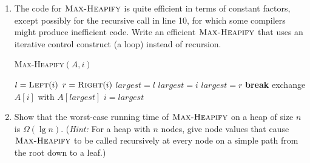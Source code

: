 \documentclass[12pt,reqno]{amsart}
\newif\ifanswer
\begin{document}
\begin{enumerate}[1.]
\item The code for $\textsc{Max-Heapify}$ is quite efficient in terms of constant factors, except possibly for the recursive call in line 10, for which some compilers might produce inefficient code. Write an efficient $\textsc{Max-Heapify}$ that uses an iterative control construct (a loop) instead of recursion.

\ifanswer
{}
\begin{algorithm}
    \caption{\textsc{Max-Heapify}$(A, i)$}
    \begin{algorithmic}[1]
        \STATE $l = \textsc{Left}(i)$
        \STATE $r = \textsc{Right}(i)$
            \STATE $largest = l$
        \ELSE
            \STATE $largest = i$
        \ENDIF
            \STATE $largest = r$
        \ENDIF
            \STATE \textbf{break}
        \ENDIF
        \STATE exchange $A[i]$ with $A[largest]$
        \STATE $i = largest$
    \ENDWHILE
    \end{algorithmic}
\end{algorithm}
\vspace{1cm}



\item Show that the worst-case running time of $\textsc{Max-Heapify}$ on a heap of size $n$ is $\Omega(\lg{n})$. (\textit{Hint:} For a heap with $n$ nodes, give node values that cause $\textsc{Max-Heapify}$ to be called recursively at every node on a simple path from the root down to a leaf.)


\end{enumerate}
\end{document}
